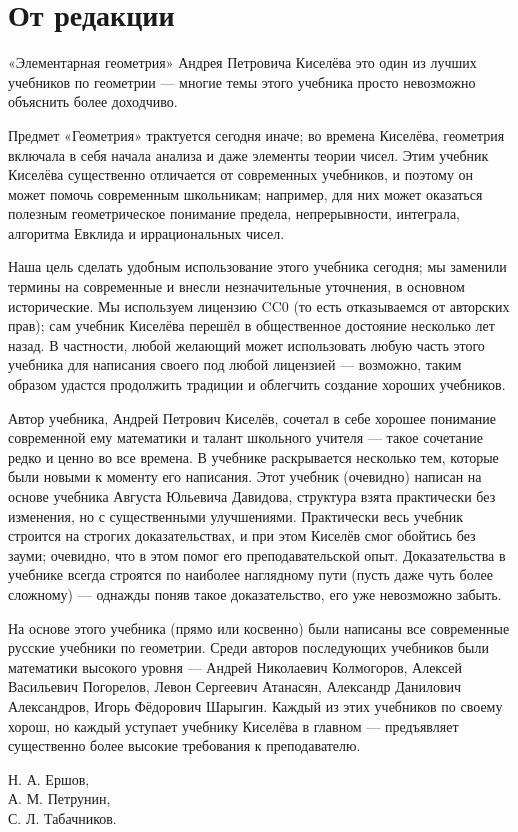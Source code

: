 \section*{От редакции}


«Элементарная геометрия» Андрея Петровича Киселёва это один из лучших учебников по геометрии —
многие темы этого учебника просто невозможно объяснить более доходчиво.

Предмет «Геометрия» трактуется сегодня иначе;
во времена Киселёва, геометрия включала в себя начала анализа и даже элементы теории чисел.
Этим учебник Киселёва существенно отличается от современных учебников, и поэтому он может помочь современным школьникам;
например, для них может оказаться полезным геометрическое понимание предела, непрерывности, интеграла, алгоритма Евклида и иррациональных чисел.

Наша цель сделать удобным использование этого учебника сегодня;
мы заменили термины на современные и внесли незначительные уточнения, в основном исторические. 
Мы используем лицензию CC0 (то есть отказываемся от авторских прав); сам учебник Киселёва перешёл в общественное достояние несколько лет назад.
В частности, любой желающий может использовать любую часть этого учебника для написания своего под любой лицензией —
возможно, таким образом удастся продолжить традиции и облегчить создание хороших учебников. 

Автор учебника, Андрей Петрович Киселёв, сочетал в себе хорошее понимание современной ему математики и талант школьного учителя — такое сочетание редко и ценно во все времена.
В учебнике раскрывается несколько тем, которые были новыми к моменту его написания. 
Этот учебник (очевидно) написан на основе учебника Августа Юльевича Давидова, структура взята практически без изменения, но с существенными улучшениями.
Практически весь учебник строится на строгих доказательствах, и при этом Киселёв смог обойтись без зауми;
очевидно, что в этом помог его преподавательской опыт.
Доказательства в учебнике всегда строятся по наиболее наглядному пути (пусть даже чуть более сложному) — однажды поняв такое доказательство, его уже невозможно забыть. 

На основе этого учебника (прямо или косвенно) были написаны все современные русские учебники по геометрии.
Среди авторов последующих учебников были математики высокого уровня — 
Андрей Николаевич Колмогоров, 
Алексей Васильевич Погорелов, 
Левон Сергеевич Атанасян, 
Александр Данилович Александров, 
Игорь Фёдорович Шарыгин.
Каждый из этих учебников по своему хорош, но каждый уступает учебнику Киселёва в главном —
предъявляет существенно более высокие требования к преподавателю.

\begin{flushright}
Н. А. Ершов,\\ 
А. М. Петрунин,\\ 
С. Л. Табачников.        
\end{flushright}
\clearpage
